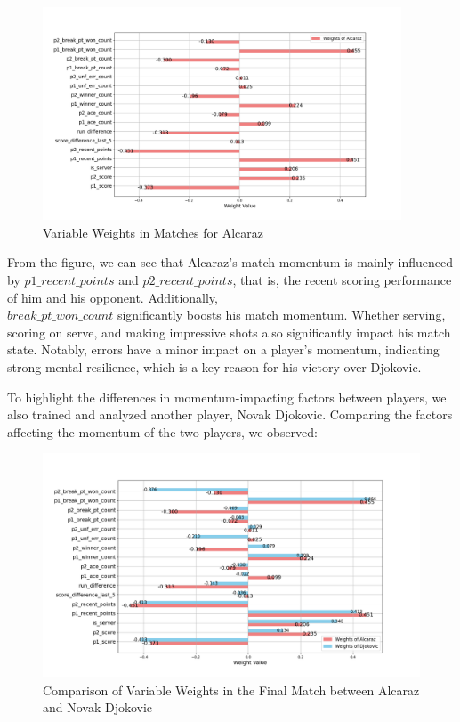 \documentclass[UTF8]{ctexart} %
\begin{document}
\begin{figure}[H]
    \centering
    \includegraphics[width=0.95\textwidth]{./graph/champion.png}
    \caption{Variable Weights in Matches for Alcaraz}
\end{figure}
From the figure, we can see that Alcaraz's match momentum is mainly influenced by \(p1\_recent\_points\) 
and \(p2\_recent\_points\), that is, the recent scoring performance of him and his opponent. Additionally,\\ 
\(break\_pt\_won\_count\) significantly boosts his match momentum. Whether serving, scoring on serve, and 
making impressive shots also significantly impact his match state. Notably, errors have a minor impact on 
a player's momentum, indicating strong mental resilience, which is a key reason for his victory over 
Djokovic.

To highlight the differences in momentum-impacting factors between players, we also trained and analyzed 
another player, Novak Djokovic. Comparing the factors affecting the momentum of the two players, we observed:

\begin{figure}[H]
    \centering
    \includegraphics[width=\textwidth]{./graph/final_game.png}
    \caption{Comparison of Variable Weights in the Final Match between Alcaraz and Novak Djokovic}
\end{figure}
\end{document}
